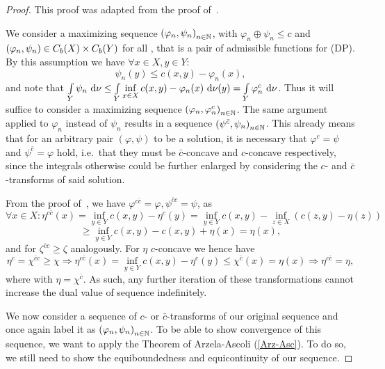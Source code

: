 \begin{proof}
	This proof was adapted from the proof of\ \cite[Proposition~1.11]{San2015}.

	We consider a maximizing sequence ${(\varphi_n, \psi_n)}_{\NinN}$, with $\varphi_n \oplus \psi_n \le c$ and $(\varphi_n, \psi_n) \in \CF[b]{X} \times \CF[b]{Y}$ for all \NinN{}, that is a pair of admissible functions for (DP). By this assumption we have $\forall x \in X, y \in Y$:
	\[ \psi_n(y) \le c(x, y) - \varphi_n(x), \]
	and note that $\int\limits_Y \psi_n~\D[\nu] \le \int\limits_Y \inf\limits_{x \in X} c(x, y) - \varphi_n(x)~\Dx[y]{\nu} = \int\limits_Y \varphi_n^c~\D[\nu]$. Thus it will suffice to consider a maximizing sequence ${(\varphi_n, \varphi_n^c)}_{\NinN}$. The same argument applied to $\varphi_n$ instead of $\psi_n$ results in a sequence ${(\psi^{\bar{c}}, \psi_n)}_{\NinN}$. This already means that for an arbitrary pair $(\varphi, \psi)$ to be a solution, it is necessary that $\varphi^c = \psi$ and $\psi^{\bar{c}} = \varphi$ hold, i.e.~that they must be $\bar{c}$-concave and $c$-concave respectively, since the integrals otherwise could be further enlarged by considering the $c$- and $\bar{c}$-transforms of said solution.

	From the proof of\ \cite[Proposition~1.34]{San2015}, we have $\varphi^{c\bar{c}} = \varphi, \psi^{\bar{c}c} = \psi$, as
	\[ \forall x \in X: \eta^{c\bar{c}}(x) = \inf\limits_{y \in Y} c(x, y) - \eta^c(y) = \inf\limits_{y \in Y} c(x, y) - \inf\limits_{z \in X} (c(z, y) - \eta(z)) \]
	\[ \ge \inf\limits_{y \in Y} c(x, y) - c(x, y) + \eta(x) = \eta(x), \]
	and for $\zeta^{\bar{c}c} \ge \zeta$ analogously. For $\eta$ $c$-concave we hence have
	\[ \eta^c = \chi^{\bar{c}c} \ge \chi \Rightarrow \eta^{c\bar{c}}(x) = \inf\limits_{y \in Y} c(x, y) - \eta^c(y) \le \chi^{\bar{c}}(x) = \eta(x) \Rightarrow \eta^{c\bar{c}} = \eta, \]
	where  with $\eta = \chi^{\bar{c}}$. As such, any further iteration of these transformations cannot increase the dual value of sequence indefinitely.

	We now consider a sequence of $c$- or $\bar{c}$-transforms of our original sequence and once again label it as ${(\varphi_n, \psi_n)}_{\NinN}$. To be able to show convergence of this sequence, we want to apply the Theorem of Arzela-Ascoli (\ref{Arz-Asc}). To do so, we still need to show the equiboundedness and equicontinuity of our sequence.
	

\end{proof}

